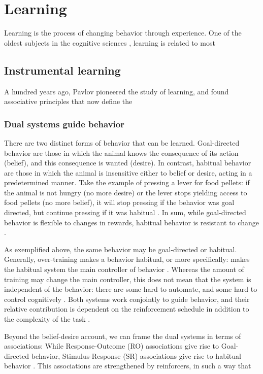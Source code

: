 \chapter{Learning}
    Learning is the process of changing behavior through experience. One of the oldest subjects in the cognitive sciences \cite{}, learning is related to most 
    
\section{Instrumental learning}
    
    A hundred years ago, Pavlov \cite{} pioneered the study of learning, and found associative principles that now define the 
    
    \subsection{Dual systems guide behavior}
        There are two distinct forms of behavior that can be learned. Goal-directed behavior are those in which the animal knows the consequence of its action (belief), and this consequence is wanted (desire). In contrast, habitual behavior are those in which the animal is insensitive either to belief or desire, acting in a predetermined manner. Take the example of pressing a lever for food pellets: if the animal is not hungry (no more desire) or the lever stops yielding access to food pellets (no more belief), it will stop pressing if the behavior was goal directed, but continue pressing if it was habitual \cite{}. In sum, while goal-directed behavior is flexible to changes in rewards, habitual behavior is resistant to change \cite{}.
        
        As exemplified above, the same behavior may be goal-directed or habitual. Generally, over-training makes a behavior habitual, or more specifically: makes the habitual system the main controller of behavior \cite{}. Whereas the amount of training may change the main controller, this does not mean that the system is independent of the behavior: there are some hard to automate, and some hard to control cognitively \cite{}. Both systems work conjointly to guide behavior, and their relative contribution is dependent on the reinforcement schedule in addition to the complexity of the task \cite{dickinson2015instrumental}.
        
        Beyond the belief-desire account, we can frame the dual systems in terms of associations: While Response-Outcome (RO) associations give rise to Goal-directed behavior, Stimulus-Response (SR) associations give rise to habitual behavior \cite{}. This associations are strengthened by reinforcers, in such a way that 
        
